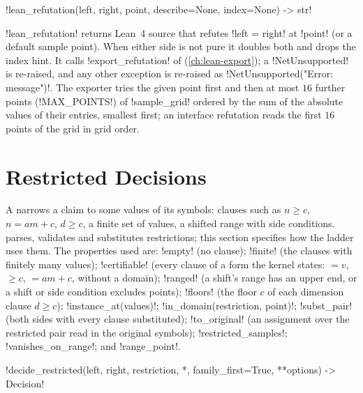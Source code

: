 \begin{signature}
\py!lean_refutation(left, right, point, describe=None, index=None) -> str!
\end{signature}
\py!lean_refutation! returns Lean~4 source that refutes \py!left = right! at \py!point! (or a default sample point). When either side is not pure it doubles both and drops the index hint. It calls \py!export_refutation! of  (\cref{ch:lean-export}); a \py!NetUnsupported! is re-raised, and any other exception is re-raised as \py!NetUnsupported("Error: message")!. The exporter tries the given point first and then at most $16$ further points (\py!MAX_POINTS!) of \py!sample_grid! ordered by the sum of the absolute values of their entries, smallest first; an interface refutation reads the first $16$ points of the grid in grid order.

\section{Restricted Decisions}\label{sec:proofs-restricted}

A  narrows a claim to some values of its symbols: clauses such as $n\ge c$, $n=am+c$, $d\ge c$, a finite set of values, a shifted range with side conditions.  parses, validates and substitutes restrictions; this section specifies how the ladder uses them. The properties used are: \py!empty! (no clause); \py!finite! (the clauses with finitely many values); \py!certifiable! (every clause of a form the kernel states: $=v$, $\ge c$, $=am+c$, without a domain); \py!ranged! (a shift's range has an upper end, or a shift or side condition excludes points); \py!floors! (the floor $c$ of each dimension clause $d\ge c$); \py!instance_at(values)!; \py!in_domain(restriction, point)!; \py!subst_pair! (both sides with every clause substituted); \py!to_original! (an assignment over the restricted pair read in the original symbols); \py!restricted_samples!; \py!vanishes_on_range!; and \py!range_point!.

\begin{signature}
\py!decide_restricted(left, right, restriction, *, family_first=True, **options) -> Decision!
\end{signature}

